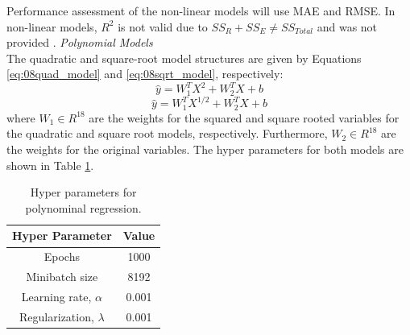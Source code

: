 Performance assessment of the non-linear models will use MAE and RMSE. In non-linear models, $R^2$ is not valid due to $SS_R + SS_E \neq SS_{Total}$ and was not provided \cite{generic_stats}.
%
%
\noindent
\textit{Polynomial Models} \\
The quadratic and square-root model structures are given by Equations \ref{eq:08quad_model} and \ref{eq:08sqrt_model}, respectively:
\begin{equation}
    \hat{y} = W_1^T X^2 + W^T_2 X + b
    \label{eq:08quad_model}
\end{equation}
\begin{equation}
    \hat{y} = W_1^T X^{1/2} + W^T_2 X + b
    \label{eq:08sqrt_model}
\end{equation}
where $W_1 \in R^{18}$ are the weights for the squared and square rooted variables for the quadratic and square root models, respectively. Furthermore, $W_2 \in R^{18}$ are the weights for the original variables. The hyper parameters for both models are shown in Table \ref{tab:08poly_hp}.
\begin{table}[h]
    \centering
    {
    \begin{tabular}{ c | c}
        Hyper Parameter                  &  Value       \\
        \hline
        Epochs                           &  1000      \\
        Minibatch size                   &  8192     \\
        Learning rate, $\alpha$          &  0.001    \\
        Regularization, $\lambda$          &  0.001  \\
    \end{tabular}}
    \caption{Hyper parameters for polynominal regression.}
    \label{tab:08poly_hp}
\end{table}

